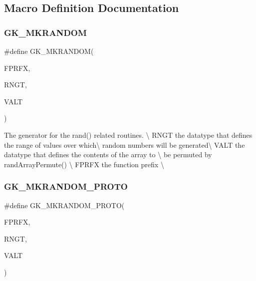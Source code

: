 \subsection{Macro Definition Documentation}
\mbox{\label{a00068_aea34b11226c16f61ff23b0487f2756e5}} 
\subsubsection{\texorpdfstring{G\+K\+\_\+\+M\+K\+R\+A\+N\+D\+OM}{GK\_MKRANDOM}}
{\footnotesize\ttfamily \#define G\+K\+\_\+\+M\+K\+R\+A\+N\+D\+OM(\begin{DoxyParamCaption}\item[{}]{F\+P\+R\+FX,  }\item[{}]{R\+N\+GT,  }\item[{}]{V\+A\+LT }\end{DoxyParamCaption})}

The generator for the rand() related routines. \textbackslash{}  R\+N\+GT the datatype that defines the range of values over which\textbackslash{} random numbers will be generated\textbackslash{}  V\+A\+LT the datatype that defines the contents of the array to \textbackslash{} be permuted by rand\+Array\+Permute() \textbackslash{}  F\+P\+R\+FX the function prefix \textbackslash{} \mbox{\label{a00068_a0a53a46698857b540420db848936c6ac}} 
\subsubsection{\texorpdfstring{G\+K\+\_\+\+M\+K\+R\+A\+N\+D\+O\+M\+\_\+\+P\+R\+O\+TO}{GK\_MKRANDOM\_PROTO}}
{\footnotesize\ttfamily \#define G\+K\+\_\+\+M\+K\+R\+A\+N\+D\+O\+M\+\_\+\+P\+R\+O\+TO(\begin{DoxyParamCaption}\item[{}]{F\+P\+R\+FX,  }\item[{}]{R\+N\+GT,  }\item[{}]{V\+A\+LT }\end{DoxyParamCaption})}


